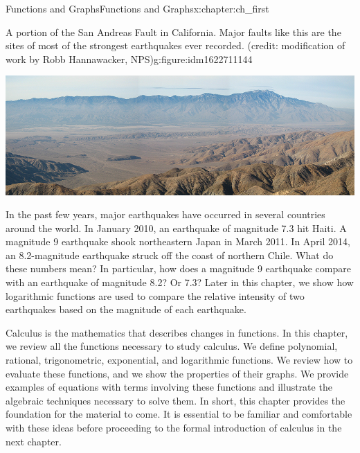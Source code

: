 \documentclass[oneside,10pt,]{book}
\numberwithin{equation}{section}
\begin{document}
\begin{chapterptx}{Functions and Graphs}{}{Functions and Graphs}{}{}{x:chapter:ch_first}
\begin{introduction}{}%
\begin{figureptx}{A portion of the San Andreas Fault in California. Major faults like this are the sites of most of the strongest earthquakes ever recorded. (credit: modification of work by Robb Hannawacker, NPS)}{g:figure:idm1622711144}{}%
\begin{image}{0.25}{0.5}{0.25}%
\includegraphics[width=\linewidth]{external/CNX_Calc_Figure_01_00_003.jpg}
\end{image}%
\tcblower
\end{figureptx}%
%
\par
In the past few years, major earthquakes have occurred in several countries around the world. In January 2010, an earthquake of magnitude 7.3 hit Haiti. A magnitude 9 earthquake shook northeastern Japan in March 2011. In April 2014, an 8.2-magnitude earthquake struck off the coast of northern Chile. What do these numbers mean? In particular, how does a magnitude 9 earthquake compare with an earthquake of magnitude 8.2? Or 7.3? Later in this chapter, we show how logarithmic functions are used to compare the relative intensity of two earthquakes based on the magnitude of each earthquake.%
\par
Calculus is the mathematics that describes changes in functions. In this chapter, we review all the functions necessary to study calculus. We define polynomial, rational, trigonometric, exponential, and logarithmic functions. We review how to evaluate these functions, and we show the properties of their graphs. We provide examples of equations with terms involving these functions and illustrate the algebraic techniques necessary to solve them. In short, this chapter provides the foundation for the material to come. It is essential to be familiar and comfortable with these ideas before proceeding to the formal introduction of calculus in the next chapter.%
\par

\end{introduction}
\end{chapterptx}
\end{document}
